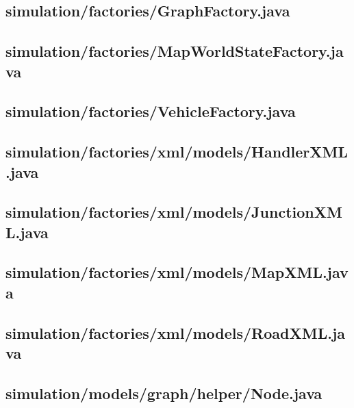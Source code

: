 \subsection{simulation/factories/GraphFactory.java}

\newpage
\subsection{simulation/factories/MapWorldStateFactory.java}

\newpage
\subsection{simulation/factories/VehicleFactory.java}

\newpage
\subsection{simulation/factories/xml/models/HandlerXML.java}

\newpage
\subsection{simulation/factories/xml/models/JunctionXML.java}

\newpage
\subsection{simulation/factories/xml/models/MapXML.java}

\newpage
\subsection{simulation/factories/xml/models/RoadXML.java}

\newpage
\subsection{simulation/models/graph/helper/Node.java}

\newpage
